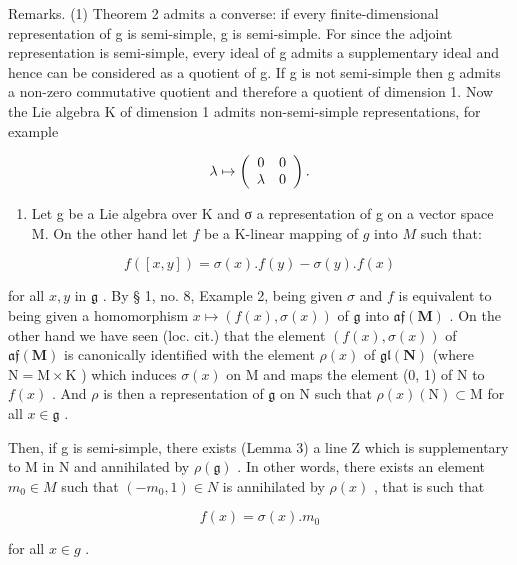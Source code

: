 Remarks. (1) Theorem 2 admits a converse: if every finite-dimensional representation of g is semi-simple, g is semi-simple. For since the adjoint representation is semi-simple, every ideal of g admits a supplementary ideal and hence can be considered as a quotient of g. If g is not semi-simple then g admits a non-zero commutative quotient and therefore a quotient of dimension 1. Now the Lie algebra K of dimension 1 admits non-semi-simple representations, for example

\[
\lambda \mapsto \left( \begin{array}{c c} 0 & 0 \\ \lambda & 0 \end{array} \right).
\]

\begin{enumerate}
\def\labelenumi{(\arabic{enumi})}
\setcounter{enumi}{1}
\tightlist
\item
  Let g be a Lie algebra over K and σ a representation of g on a vector space M. On the other hand let \(f\) be a K-linear mapping of \(g\) into \(M\) such that:
\end{enumerate}

\[
f ([ x, y ]) = \sigma (x). f (y) - \sigma (y). f (x)\tag{1}
\]

for all \(x, y\) in \(\mathfrak{g}\) . By § 1, no. 8, Example 2, being given \(\sigma\) and \(f\) is equivalent to being given a homomorphism \(x \mapsto (f(x), \sigma(x))\) of \(\mathfrak{g}\) into \(\mathfrak{af}(\mathbf{M})\) . On the other hand we have seen (loc. cit.) that the element \((f(x), \sigma(x))\) of \(\mathfrak{af}(\mathbf{M})\) is canonically identified with the element \(\rho(x)\) of \(\mathfrak{gl}(\mathbf{N})\) (where \(\mathrm{N} = \mathrm{M} \times \mathrm{K}\) ) which induces \(\sigma(x)\) on \(\mathrm{M}\) and maps the element (0, 1) of \(\mathrm{N}\) to \(f(x)\) . And \(\rho\) is then a representation of \(\mathfrak{g}\) on \(\mathrm{N}\) such that \(\rho(x)(\mathrm{N}) \subset \mathrm{M}\) for all \(x \in \mathfrak{g}\) .

Then, if g is semi-simple, there exists (Lemma 3) a line Z which is supplementary to M in N and annihilated by \(\rho(\mathfrak{g})\) . In other words, there exists an element \(m_{0} \in M\) such that \((-m_{0}, 1) \in N\) is annihilated by \(\rho(x)\) , that is such that

\[
f (x) = \sigma (x). m _ {0}\tag{2}
\]

for all \(x \in g\) .

